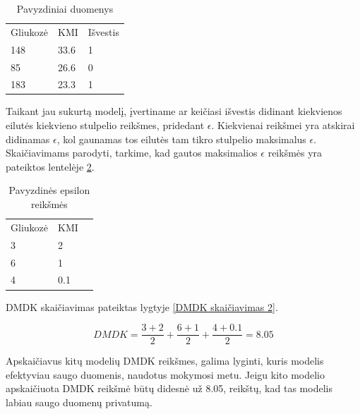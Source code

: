 \documentclass{VUMIFInfBakalaurinis}
\begin{document}
\begin{table}[h]
\centering
\begin{tabular}{|l|l|l|}
\cline{1-3}
Gliukozė & KMI  & Išvestis \\\cline{1-3}
148      & 33.6 & 1        \\\cline{1-3}
85       & 26.6 & 0        \\\cline{1-3}
183      & 23.3 & 1        \\\cline{1-3}
\end{tabular}
\caption{Pavyzdiniai duomenys}
\label{tab:Pavyzdiniai duomenys 1}
\end{table}

\par Taikant jau sukurtą modelį, įvertiname ar keičiasi išvestis didinant kiekvienos eilutės kiekvieno stulpelio reikšmes, pridedant $\epsilon$. Kiekvienai reikšmei yra atskirai didinamas $\epsilon$, kol gaunamas tos eilutės tam tikro stulpelio maksimalus $\epsilon$. Skaičiavimams parodyti, tarkime, kad gautos maksimalios $\epsilon$ reikšmės yra pateiktos lentelėje \ref{tab:my-table2}.

\begin{table}[t]
\centering
\begin{tabular}{|l|l|l|}
\cline{1-2}
Gliukozė & KMI \\\cline{1-2}
3      & 2 \\\cline{1-2}
6       & 1 \\\cline{1-2}
4      & 0.1 \\\cline{1-2}
\end{tabular}
\caption{Pavyzdinės epsilon reikšmės}
\label{tab:my-table2}
\end{table}

\par DMDK skaičiavimas pateiktas lygtyje \eqref{DMDK skaičiavimas 2}.

\begin{equation}
DMDK = \frac{3 + 2}{2} + \frac{6 + 1}{2} + \frac{4 + 0.1}{2} = 8.05
\label{DMDK skaičiavimas 2}
\end{equation}

\par Apskaičiavus kitų modelių DMDK reikšmes, galima lyginti, kuris modelis efektyviau saugo duomenis, naudotus mokymosi metu. Jeigu kito modelio apskaičiuota DMDK reikšmė būtų didesnė už 8.05, reikštų, kad tas modelis labiau saugo duomenų privatumą.
\end{document}
